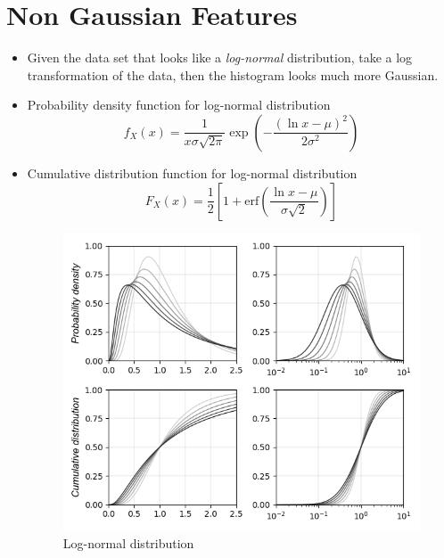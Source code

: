 \section{Non Gaussian Features}
\begin{itemize}
    \item Given the data set that looks like a \emph{log-normal} distribution, 
    take a log transformation of the data, then the histogram looks much more Gaussian.
    
    \item Probability density function for log-normal distribution
    \begin{equation}
        f_X(x) = \frac{1}{x\sigma\sqrt{2\pi}}\exp{\left(-\frac{\left(\ln x - \mu\right)^2}{2\sigma^2}\right)}
    \end{equation}
    
    \item Cumulative distribution function for log-normal distribution
    \begin{equation}
        F_X(x) = \frac{1}{2} \left[1 + \text{erf}\left(\frac{\ln x - \mu}{\sigma \sqrt{2}}\right) \right]
    \end{equation}
    
    \begin{figure}[!htbp]
        \centering
        \includegraphics[width=4.2in]{./images/logNormalDistribution.png}
        \caption{Log-normal distribution}
    \end{figure}
    
\end{itemize}

